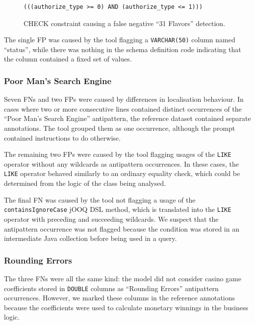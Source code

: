 \begin{figure}[h]
    \begin{lstlisting}[frame=none, basicstyle=\small, breaklines=true, breakatwhitespace=false, breakindent=0pt]
(((authorize_type >= 0) AND (authorize_type <= 1)))
    \end{lstlisting}
    \caption{CHECK constraint causing a false negative “31 Flavors” detection.}
    \label{fig:checkConstraint}
\end{figure}

The single FP was caused by the tool flagging a \texttt{VARCHAR(50)} column named “status”, while there was nothing in the schema definition code indicating that the column contained a fixed set of values.

\subsubsection*{Poor Man's Search Engine}
Seven FNs and two FPs were caused by differences in localisation behaviour. In cases where two or more consecutive lines contained distinct occurrences of the “Poor Man's Search Engine” antipattern, the reference dataset contained separate annotations. The tool grouped them as one occurrence, although the prompt contained instructions to do otherwise.

The remaining two FPs were caused by the tool flagging usages of the \texttt{LIKE} operator without any wildcards as antipattern occurrences. In these cases, the \texttt{LIKE} operator behaved similarly to an ordinary equality check, which could be determined from the logic of the class being analysed.

The final FN was caused by the tool not flagging a usage of the \texttt{containsIgnoreCase} jOOQ DSL method, which is translated into the \texttt{LIKE} operator with preceding and succeeding wildcards. We suspect that the antipattern occurrence was not flagged because the condition was stored in an intermediate Java collection before being used in a query.

\subsubsection*{Rounding Errors}
The three FNs were all the same kind: the model did not consider casino game coefficients stored in \texttt{DOUBLE} columns as “Rounding Errors” antipattern occurrences. However, we marked these columns in the reference annotations because the coefficients were used to calculate monetary winnings in the business logic.

